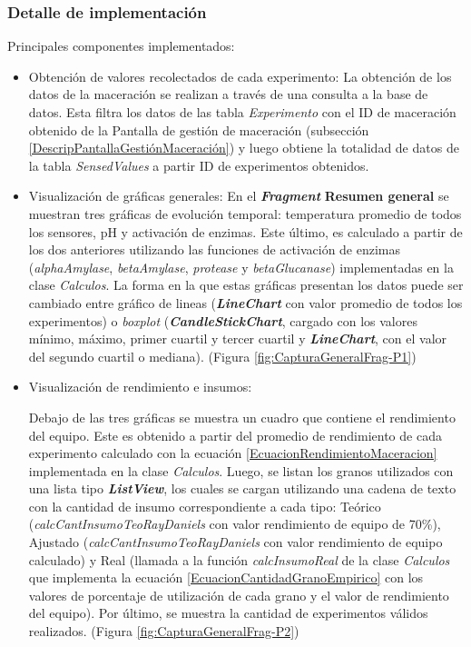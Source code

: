             \subsubsection{Detalle de implementación}
             \par Principales componentes implementados:
             \begin{itemize}
                 \item Obtención de valores recolectados de cada experimento: La obtención de los datos de la maceración se realizan a través de una consulta a la base de datos. Esta filtra los datos de las tabla \textit{Experimento} con el ID de maceración obtenido de la Pantalla de gestión de maceración (subsección \ref{DescripPantallaGestiónMaceración}) y luego obtiene la totalidad de datos de la tabla \textit{SensedValues} a partir ID de experimentos obtenidos.
                 
                 \item Visualización de gráficas generales: En el \textbf{\textit{\gls{Fragment}}} \textbf{Resumen general} se muestran tres gráficas de evolución temporal: temperatura promedio de todos los sensores, pH y activación de enzimas. Este último, es calculado a partir de los dos anteriores utilizando las funciones de activación de enzimas (\textit{alphaAmylase}, \textit{betaAmylase}, \textit{protease} y \textit{betaGlucanase}) implementadas en la clase \textit{Calculos}. La forma en la que estas gráficas presentan los datos puede ser cambiado entre gráfico de lineas (\textbf{\textit{\gls{LineChart}}} con valor promedio de todos los experimentos) o \textit{boxplot} (\textbf{\textit{\gls{CandleStickChart}}}, cargado con los valores mínimo, máximo, primer cuartil y tercer cuartil y \textbf{\textit{\gls{LineChart}}}, con el valor del segundo cuartil o mediana). (Figura \ref{fig:CapturaGeneralFrag-P1})
                 
                 \item Visualización de rendimiento e insumos: \par Debajo de las tres gráficas se muestra un cuadro que contiene el rendimiento del equipo. Este es obtenido a partir del promedio de rendimiento de cada experimento calculado con la ecuación \ref{EcuacionRendimientoMaceracion} implementada en la clase \textit{Calculos}. Luego, se listan los granos utilizados con una lista tipo \textbf{\textit{\gls{ListView}}}, los cuales se cargan utilizando una cadena de texto con la cantidad de insumo correspondiente a cada tipo: Teórico (\textit{calcCantInsumoTeoRayDaniels} con valor rendimiento de equipo de 70\%), Ajustado (\textit{calcCantInsumoTeoRayDaniels} con valor rendimiento de equipo calculado) y Real (llamada a la función \textit{calcInsumoReal} de la clase \textit{Calculos} que implementa la ecuación  \ref{EcuacionCantidadGranoEmpirico} con los valores de porcentaje de utilización de cada grano y el valor de rendimiento del equipo). Por último, se muestra la cantidad de experimentos válidos realizados. (Figura \ref{fig:CapturaGeneralFrag-P2})
                 

\end{itemize}
